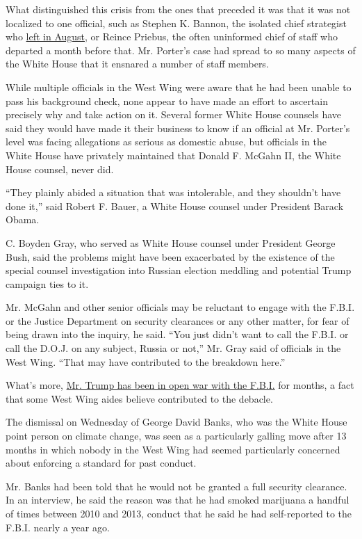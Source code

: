 What distinguished this crisis from the ones that preceded it was that
it was not localized to one official, such as Stephen K. Bannon, the
isolated chief strategist who
\href{https://www.nytimes3xbfgragh.onion/2017/08/18/us/politics/steve-bannon-trump-white-house.html}{left
in August}, or Reince Priebus, the often uninformed chief of staff who
departed a month before that. Mr. Porter's case had spread to so many
aspects of the White House that it ensnared a number of staff members.

While multiple officials in the West Wing were aware that he had been
unable to pass his background check, none appear to have made an effort
to ascertain precisely why and take action on it. Several former White
House counsels have said they would have made it their business to know
if an official at Mr. Porter's level was facing allegations as serious
as domestic abuse, but officials in the White House have privately
maintained that Donald F. McGahn II, the White House counsel, never did.

``They plainly abided a situation that was intolerable, and they
shouldn't have done it,'' said Robert F. Bauer, a White House counsel
under President Barack Obama.

C. Boyden Gray, who served as White House counsel under President George
Bush, said the problems might have been exacerbated by the existence of
the special counsel investigation into Russian election meddling and
potential Trump campaign ties to it.

Mr. McGahn and other senior officials may be reluctant to engage with
the F.B.I. or the Justice Department on security clearances or any other
matter, for fear of being drawn into the inquiry, he said. ``You just
didn't want to call the F.B.I. or call the D.O.J. on any subject, Russia
or not,'' Mr. Gray said of officials in the West Wing. ``That may have
contributed to the breakdown here.''

What's more,
\href{https://www.nytimes3xbfgragh.onion/2018/02/03/us/politics/trump-fbi-justice.html}{Mr.
Trump has been in open war with the F.B.I.} for months, a fact that some
West Wing aides believe contributed to the debacle.

The dismissal on Wednesday of George David Banks, who was the White
House point person on climate change, was seen as a particularly galling
move after 13 months in which nobody in the West Wing had seemed
particularly concerned about enforcing a standard for past conduct.

Mr. Banks had been told that he would not be granted a full security
clearance. In an interview, he said the reason was that he had smoked
marijuana a handful of times between 2010 and 2013, conduct that he said
he had self-reported to the F.B.I. nearly a year ago.

